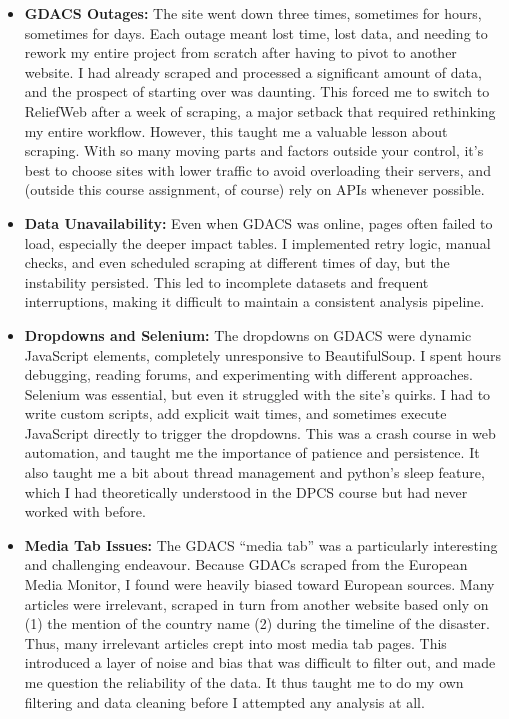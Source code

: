 \documentclass[12pt]{article}
\begin{document}
\begin{itemize}
    \item \textbf{GDACS Outages:} The site went down three times, sometimes for hours, sometimes for days. Each outage meant lost time, lost data, and needing to rework my entire project from scratch after having to pivot to another website. I had already scraped and processed a significant amount of data, and the prospect of starting over was daunting. This forced me to switch to ReliefWeb after a week of scraping, a major setback that required rethinking my entire workflow. However, this taught me a valuable lesson about scraping. With so many moving parts and factors outside your control, it's best to choose sites with lower traffic to avoid overloading their servers, and (outside this course assignment, of course) rely on APIs whenever possible.
    \item \textbf{Data Unavailability:} Even when GDACS was online, pages often failed to load, especially the deeper impact tables. I implemented retry logic, manual checks, and even scheduled scraping at different times of day, but the instability persisted. This led to incomplete datasets and frequent interruptions, making it difficult to maintain a consistent analysis pipeline.
    \item \textbf{Dropdowns and Selenium:} The dropdowns on GDACS were dynamic JavaScript elements, completely unresponsive to BeautifulSoup. I spent hours debugging, reading forums, and experimenting with different approaches. Selenium was essential, but even it struggled with the site's quirks. I had to write custom scripts, add explicit wait times, and sometimes execute JavaScript directly to trigger the dropdowns. This was a crash course in web automation, and taught me the importance of patience and persistence. It also taught me a bit about thread management and python's sleep feature, which I had theoretically understood in the DPCS course but had never worked with before.
    \item \textbf{Media Tab Issues:} The GDACS “media tab” was a particularly interesting and challenging endeavour. Because GDACs scraped from the European Media Monitor, I found were heavily biased toward European sources. Many articles were irrelevant, scraped in turn from another website based only on (1) the mention of the country name (2) during the timeline of the disaster. Thus, many irrelevant articles crept into most media tab pages. This introduced a layer of noise and bias that was difficult to filter out, and made me question the reliability of the data. It thus taught me to do my own filtering and data cleaning before I attempted any analysis at all.

\end{itemize}
\end{document}

